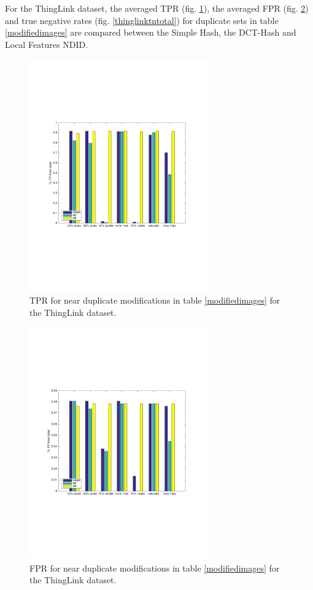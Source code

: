 \documentclass[english,12pt,a4paper,pdftex,elec,utf8]{aaltothesis}
\begin{document}
\clearpage

For the ThingLink dataset, the averaged TPR (fig. \ref{thinglinktptotal}), the averaged FPR (fig. \ref{thinglinkfptotal}) and true negative rates (fig. \ref{thinglinktntotal}) for duplicate sets in table \ref{modifiedimages} are compared between the Simple Hash, the DCT-Hash and Local Features NDID.

\begin{figure}[htb]
\begin{center}
\includegraphics[height=10cm]{figures/thinglink_tpBar}
\end{center}
\caption{ TPR for near duplicate modifications in table \ref{modifiedimages} for the ThingLink dataset.}
\label{thinglinktptotal}
\end{figure}

\begin{figure}[htb]
\begin{center}
\includegraphics[height=10cm]{figures/thinglink_fpBar}
\end{center}
\caption{ FPR for near duplicate modifications in table \ref{modifiedimages} for the ThingLink dataset.}
\label{thinglinkfptotal}
\end{figure}
\end{document}
